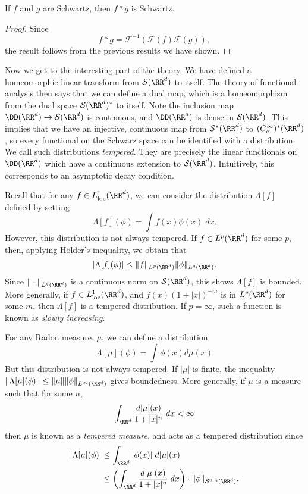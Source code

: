 \begin{corollary}
    If $f$ and $g$ are Schwartz, then $f * g$ is Schwartz.
\end{corollary}
\begin{proof}
    Since
    \[ f * g = \mathcal{F}^{-1}(\mathcal{F}(f) \mathcal{F}(g)), \]
    the result follows from the previous results we have shown.
\end{proof}

Now we get to the interesting part of the theory. We have defined a homeomorphic linear transform from $\mathcal{S}(\RR^d)$ to itself. The theory of functional analysis then says that we can define a dual map, which is a homeomorphism from the dual space $\mathcal{S}(\RR^d)^*$ to itself. Note the inclusion map $\DD(\RR^d) \to \mathcal{S}(\RR^d)$ is continuous, and $\DD(\RR^d)$ is dense in $\mathcal{S}(\RR^d)$. This implies that we have an injective, continuous map from $\mathcal{S}^*(\RR^d)$ to $(C_c^\infty)^*(\RR^d)$, so every functional on the Schwarz space can be identified with a distribution. We call such distributions \emph{tempered}. They are precisely the linear functionals on $\DD(\RR^d)$ which have a continuous extension to $\mathcal{S}(\RR^d)$. Intuitively, this corresponds to an asymptotic decay condition.

\begin{example}
    Recall that for any $f \in L^1_{\text{loc}}(\RR^d)$, we can consider the distribution $\Lambda[f]$ defined by setting
    \[ \Lambda[f](\phi) = \int f(x) \phi(x)\; dx. \]
    However, this distribution is not always tempered. If $f \in L^p(\RR^d)$ for some $p$, then, applying H\"{o}lder's inequality, we obtain that
    \[ |\Lambda[f](\phi)| \leq \| f \|_{L^p(\RR^d)} \| \phi \|_{L^q(\RR^d)}. \]
    Since $\| \cdot \|_{L^q(\RR^d)}$ is a continuous norm on $\mathcal{S}(\RR^d)$, this shows $\Lambda[f]$ is bounded. More generally, if $f \in L^1_{\text{loc}}(\RR^d)$, and $f(x) (1 + |x|)^{-m}$ is in $L^p(\RR^d)$ for some $m$, then $\Lambda[f]$ is a tempered distribution. If $p = \infty$, such a function is known as \emph{slowly increasing}.
\end{example}

\begin{example}
    For any Radon measure, $\mu$, we can define a distribution
    \[ \Lambda[\mu](\phi) = \int \phi(x) d\mu(x) \]
    But this distribution is not always tempered. If $|\mu|$ is finite, the inequality $\| \Lambda[\mu](\phi) \| \leq \| \mu \| \| \phi \|_{L^\infty(\RR^d)}$ gives boundedness. More generally, if $\mu$ is a measure such that for some $n$,
    \[ \int_{\RR^d} \frac{d|\mu|(x)}{1 + |x|^n}\; dx < \infty \]
    then $\mu$ is known as a \emph{tempered measure}, and acts as a tempered distribution since
    \begin{align*}
      |\Lambda[\mu](\phi)| &\leq \int_{\RR^d} |\phi(x)|\; d|\mu|(x)\\
      &\leq \left( \int_{\RR^d} \frac{d|\mu|(x)}{1 + |x|^n}\; dx \right) \cdot \| \phi \|_{\mathcal{S}^{0,n}(\RR^d)}.
    \end{align*}
\end{example}

